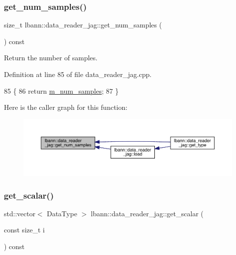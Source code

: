 \subsubsection{\texorpdfstring{get\+\_\+num\+\_\+samples()}{get\_num\_samples()}}
{\footnotesize\ttfamily size\+\_\+t lbann\+::data\+\_\+reader\+\_\+jag\+::get\+\_\+num\+\_\+samples (\begin{DoxyParamCaption}{ }\end{DoxyParamCaption}) const}



Return the number of samples. 



Definition at line 85 of file data\+\_\+reader\+\_\+jag.\+cpp.


\begin{DoxyCode}
85                                               \{
86   \textcolor{keywordflow}{return} \hyperlink{classlbann_1_1data__reader__jag_a25ceffff7e8d6641e785efa033530011}{m\_num\_samples};
87 \}
\end{DoxyCode}
Here is the caller graph for this function\+:\nopagebreak
\begin{figure}[H]
\begin{center}
\leavevmode
\includegraphics[width=350pt]{classlbann_1_1data__reader__jag_a321580d6f335308e19868b4c3d5c9558_icgraph}
\end{center}
\end{figure}
\mbox{\label{classlbann_1_1data__reader__jag_ad99fffc2f11cb6f3fc42ef1138a3f925}} 
\subsubsection{\texorpdfstring{get\+\_\+scalar()}{get\_scalar()}}
{\footnotesize\ttfamily std\+::vector$<$ Data\+Type $>$ lbann\+::data\+\_\+reader\+\_\+jag\+::get\+\_\+scalar (\begin{DoxyParamCaption}\item[{const size\+\_\+t}]{i }\end{DoxyParamCaption}) const}



